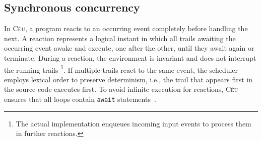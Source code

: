 \documentclass[preprint]{sigplanconf}
\newcommand{\CEU}{\textsc{C\'{e}u}\xspace}
\newcommand{\code}[1] {{\small{\texttt{#1}}}}
\newcommand{\1}{\;}
\newcommand{\2}{\;\;}
\newcommand{\3}{\;\;\;}
\newcommand{\5}{\;\;\;\;\;}
\begin{document}

\subsection{Synchronous concurrency}
\label{sec.ceu.sync}

In \CEU, a program reacts to an occurring event completely before handling the 
next.
%
A reaction represents a logical instant in which all trails awaiting the 
occurring event awake and execute, one after the other, until they await again 
or terminate.
%
During a reaction, the environment is invariant and does not interrupt the 
running trails%
\footnote{
The actual implementation enqueues incoming input events to process them in 
further reactions.
}.
If multiple trails react to the same event, the scheduler employs lexical order 
to preserve determinism, i.e., the trail that appears first in the source code 
executes first.
%
To avoid infinite execution for reactions, \CEU ensures that all loops contain 
\code{await} statements~\cite{ceu.sensys13}.
\end{document}
